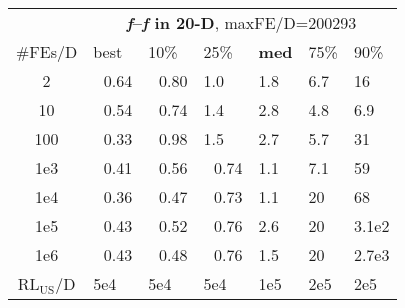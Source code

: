 \begin{tabular}{c|llllll}
 & \multicolumn{6}{|c}{\textbf{\textit{f}\raisebox{-0.35ex}{1}--\textit{f}\raisebox{-0.35ex}{24} in 20-D}, maxFE/D=200293}\\
\#FEs/D & best & 10\% & 25\% & \textbf{med} & 75\% & 90\%\\
2 & ~\,0.64 & ~\,0.80 & \hspace*{1ex}1.0 & \hspace*{1ex}1.8 & \hspace*{1ex}6.7 & 16\\
10 & ~\,0.54 & ~\,0.74 & \hspace*{1ex}1.4 & \hspace*{1ex}2.8 & \hspace*{1ex}4.8 & \hspace*{1ex}6.9\\
100 & ~\,0.33 & ~\,0.98 & \hspace*{1ex}1.5 & \hspace*{1ex}2.7 & \hspace*{1ex}5.7 & 31\\
1e3 & ~\,0.41 & ~\,0.56 & ~\,0.74 & \hspace*{1ex}1.1 & \hspace*{1ex}7.1 & 59\\
1e4 & ~\,0.36 & ~\,0.47 & ~\,0.73 & \hspace*{1ex}1.1 & 20 & 68\\
1e5 & ~\,0.43 & ~\,0.52 & ~\,0.76 & \hspace*{1ex}2.6 & 20 & 3.1e2\\
1e6 & ~\,0.43 & ~\,0.48 & ~\,0.76 & \hspace*{1ex}1.5 & 20 & 2.7e3\\
$\text{RL}_{\text{US}}$/D & 5e4 & 5e4 & 5e4 & 1e5 & 2e5 & 2e5
\end{tabular}
